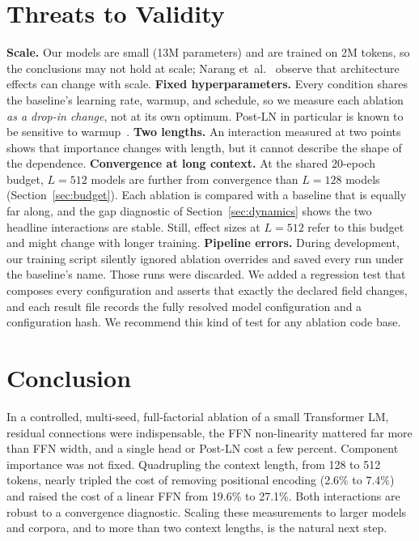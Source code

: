 \documentclass[conference]{IEEEtran}
\begin{document}
\section{Threats to Validity}\label{sec:validity}
\textbf{Scale.} Our models are small (13M parameters) and are trained on 2M tokens, so the
conclusions may not hold at scale; Narang et~al.~\cite{narang2021transformer} observe that
architecture effects can change with scale.
\textbf{Fixed hyperparameters.} Every condition shares the baseline's learning rate, warmup, and
schedule, so we measure each ablation \emph{as a drop-in change}, not at its own optimum. Post-LN
in particular is known to be sensitive to warmup~\cite{xiong2020layer}.
\textbf{Two lengths.} An interaction measured at two points shows that importance changes with
length, but it cannot describe the shape of the dependence.
\textbf{Convergence at long context.} At the shared 20-epoch budget, $L{=}512$ models are further
from convergence than $L{=}128$ models (Section~\ref{sec:budget}). Each ablation is compared with a
baseline that is equally far along, and the gap diagnostic of Section~\ref{sec:dynamics} shows the two
headline interactions are stable. Still, effect sizes at $L{=}512$ refer to this budget and might
change with longer training.
\textbf{Pipeline errors.} During development, our training script silently ignored ablation
overrides and saved every run under the baseline's name. Those runs were discarded. We added a
regression test that composes every configuration and asserts that exactly the declared field
changes, and each result file records the fully resolved model configuration and a configuration
hash. We recommend this kind of test for any ablation code base.

\section{Conclusion}
In a controlled, multi-seed, full-factorial ablation of a small Transformer LM, residual connections
were indispensable, the FFN non-linearity mattered far more than FFN width, and a single head or
Post-LN cost a few percent. Component importance was not fixed. Quadrupling the context length,
from 128 to 512 tokens, nearly tripled the cost of removing positional encoding (2.6\% to 7.4\%)
and raised the cost of a linear FFN from 19.6\% to 27.1\%. Both interactions are robust to a
convergence diagnostic. Scaling
these measurements to larger models and corpora, and to more than two context lengths, is the
natural next step.



\end{document}
